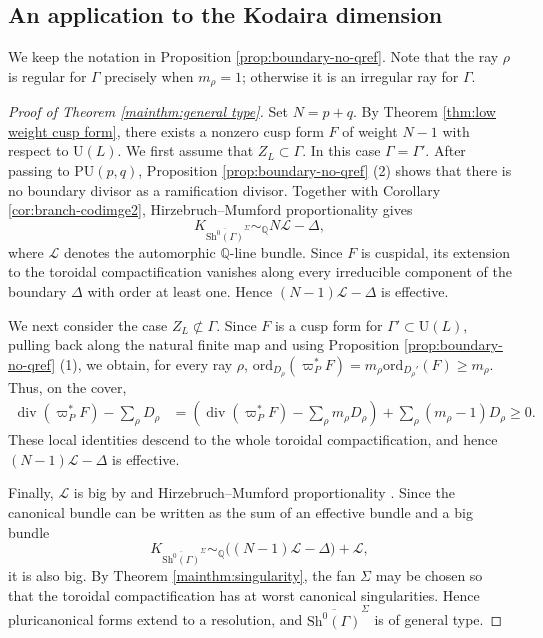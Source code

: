 \documentclass[11pt]{amsart}
\theoremstyle{plain}
\theoremstyle{definition}
\numberwithin{equation}{section}
\def\div{\mathop{\mathrm{div}}\nolimits}
\def\ord{\mathrm{ord}}
\def\L{\mathscr{L}}
\def\U{\mathrm{U}}
\newcommand{\bbQ}{\mathbb{Q}}
\begin{document}
\subsection{An application to the Kodaira dimension}
We keep the notation in Proposition \ref{prop:boundary-no-qref}.
Note that the ray $\rho$ is regular for $\Gamma$ precisely when $m_\rho=1$; otherwise it is an
irregular ray for $\Gamma$.



\begin{proof}[Proof of Theorem \ref{mainthm:general type}]
Set $N=p+q$.  By Theorem \ref{thm:low weight cusp form}, there exists a
nonzero cusp form $F$ of weight $N-1$ with respect to $\U(L)$. 
We first assume that $Z_L\subset\Gamma$.  In this case $\Gamma=\Gamma'$.
After passing to 
$\mathrm{PU}(p,q)$, Proposition \ref{prop:boundary-no-qref} (2) shows that 
there is no boundary divisor as a ramification divisor.
Together with
Corollary \ref{cor:branch-codimge2}, Hirzebruch--Mumford proportionality \cite{mumford1977hirzebruch}
gives
\begin{equation}\label{eq:canonical-center-contained}
K_{\overline{\mathrm{Sh}^0(\Gamma)}^{\Sigma}}
 \sim_{\bbQ}N\L-\Delta,
\end{equation}
where $\L$ denotes the automorphic $\bbQ$-line bundle.
Since $F$ is cuspidal, its extension to the toroidal compactification
vanishes along every irreducible component of the boundary
$\Delta$ with order at least one.  Hence $(N-1)\L-\Delta$ is effective.

We next consider the case $Z_L\not\subset\Gamma$.  
Since $F$ is a cusp form for $\Gamma'\subset\U(L)$, pulling back along the natural finite map and using Proposition \ref{prop:boundary-no-qref} (1), we obtain, for every ray $\rho$,
$\ord_{D_\rho}(\varpi_P^*F)=m_\rho\ord_{D_\rho'}(F)\geq m_\rho$.
Thus, on the cover,
\begin{align*}
\div(\varpi_P^*F)-\sum_\rho D_\rho
&=\left(\div(\varpi_P^*F)-\sum_\rho m_\rho D_\rho\right)
  +\sum_\rho(m_\rho-1)D_\rho
\geq0.
\end{align*}
These local identities descend to the whole toroidal compactification, and hence $(N-1)\L-\Delta$ is effective.

Finally, $\L$ is big by \cite{Baily1966compactification} 
and
Hirzebruch--Mumford proportionality \cite{mumford1977hirzebruch}.  Since the canonical bundle can be written as the sum of an effective bundle and a big bundle
\[
K_{\overline{\mathrm{Sh}^0(\Gamma)}^{\Sigma}}
 \sim_{\bbQ}\bigl((N-1)\L-\Delta\bigr)+\L,
\]
it is also big.  By Theorem \ref{mainthm:singularity}, the fan $\Sigma$ may
be chosen so that the toroidal compactification has at worst canonical
singularities.  Hence pluricanonical forms extend to a resolution, and
$\overline{\mathrm{Sh}^0(\Gamma)}^{\Sigma}$ is of general type.
\end{proof}
\end{document}
